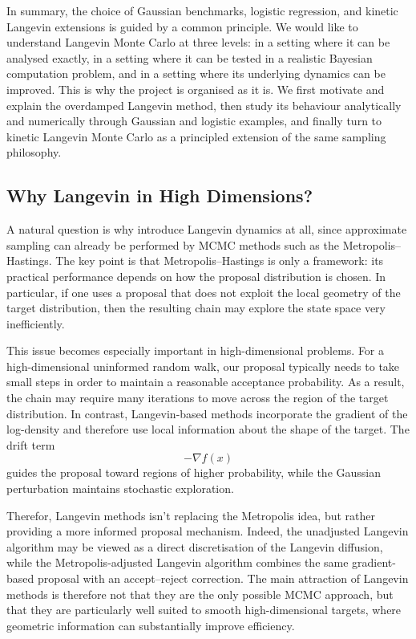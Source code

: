 \documentclass[a4paper,11pt, titlepage]{article}
\theoremstyle{definition}
\theoremstyle{plain}
\theoremstyle{remark}
\begin{document}
In summary, the choice of Gaussian benchmarks, logistic regression, and kinetic Langevin extensions is guided by a common principle. We would like to understand Langevin Monte Carlo at three levels: in a setting where it can be analysed exactly, in a setting where it can be tested in a realistic Bayesian computation problem, and in a setting where its underlying dynamics can be improved. This is why the project is organised as it is. We first motivate and explain the overdamped Langevin method, then study its behaviour analytically and numerically through Gaussian and logistic examples, and finally turn to kinetic Langevin Monte Carlo as a principled extension of the same sampling philosophy.

\subsection{Why Langevin in High Dimensions?}

A natural question is why introduce Langevin dynamics at all, since approximate sampling can already be performed by MCMC methods such as the Metropolis--Hastings. The key point is that Metropolis--Hastings is only a framework: its practical performance depends on how the proposal distribution is chosen. In particular, if one uses a proposal that does not exploit the local geometry of the target distribution, then the resulting chain may explore the state space very inefficiently.

This issue becomes especially important in high-dimensional problems. For a high-dimensional uninformed random walk, our proposal typically needs to take small steps in order to maintain a reasonable acceptance probability. As a result, the chain may require many iterations to move across the region of the target distribution. In contrast, Langevin-based methods incorporate the gradient of the log-density and therefore use local information about the shape of the target. The drift term
\[
-\nabla f(x)
\]
guides the proposal toward regions of higher probability, while the Gaussian perturbation maintains stochastic exploration.

Therefor, Langevin methods isn't replacing the Metropolis idea, but rather providing a more informed proposal mechanism. Indeed, the unadjusted Langevin algorithm may be viewed as a direct discretisation of the Langevin diffusion, while the Metropolis-adjusted Langevin algorithm combines the same gradient-based proposal with an accept--reject correction. The main attraction of Langevin methods is therefore not that they are the only possible MCMC approach, but that they are particularly well suited to smooth high-dimensional targets, where geometric information can substantially improve efficiency.
\end{document}
